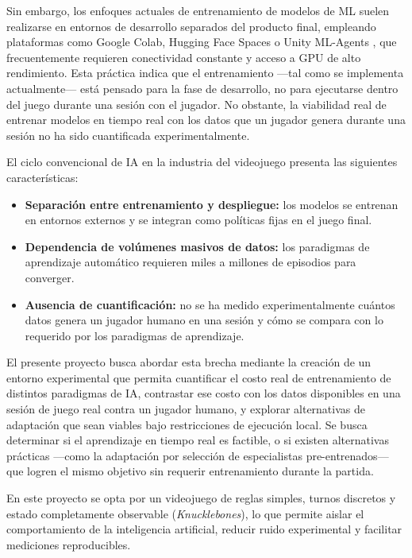 Sin embargo, los enfoques actuales de entrenamiento de modelos de ML suelen realizarse en entornos de desarrollo separados del producto final, empleando plataformas como Google Colab, Hugging Face Spaces o Unity ML-Agents \cite{juliani2018mlagents}, que frecuentemente requieren conectividad constante y acceso a GPU de alto rendimiento. Esta práctica indica que el entrenamiento ---tal como se implementa actualmente--- está pensado para la fase de desarrollo, no para ejecutarse dentro del juego durante una sesión con el jugador. No obstante, la viabilidad real de entrenar modelos en tiempo real con los datos que un jugador genera durante una sesión no ha sido cuantificada experimentalmente.

El ciclo convencional de IA en la industria del videojuego presenta las siguientes características:

\begin{itemize}
    \item \textbf{Separación entre entrenamiento y despliegue:} los modelos se entrenan en entornos externos y se integran como políticas fijas en el juego final.
    \item \textbf{Dependencia de volúmenes masivos de datos:} los paradigmas de aprendizaje automático requieren miles a millones de episodios para converger.
    \item \textbf{Ausencia de cuantificación:} no se ha medido experimentalmente cuántos datos genera un jugador humano en una sesión y cómo se compara con lo requerido por los paradigmas de aprendizaje.
\end{itemize}

El presente proyecto busca abordar esta brecha mediante la creación de un entorno experimental que permita cuantificar el costo real de entrenamiento de distintos paradigmas de IA, contrastar ese costo con los datos disponibles en una sesión de juego real contra un jugador humano, y explorar alternativas de adaptación que sean viables bajo restricciones de ejecución local. Se busca determinar si el aprendizaje en tiempo real es factible, o si existen alternativas prácticas ---como la adaptación por selección de especialistas pre-entrenados--- que logren el mismo objetivo sin requerir entrenamiento durante la partida.

En este proyecto se opta por un videojuego de reglas simples, turnos discretos y estado completamente observable (\textit{Knucklebones}), lo que permite aislar el comportamiento de la inteligencia artificial, reducir ruido experimental y facilitar mediciones reproducibles.


